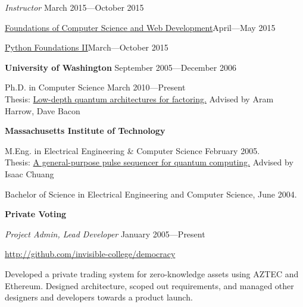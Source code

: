 \documentclass[letter]{article}
\begin{document}
\par
{\em Instructor} \hfill March 2015---October 2015

\vspace{0.5\baselineskip}
\par
\href{https://www.codefellows.org/courses/foundations-1/computer-science-and-web-development}{Foundations of Computer Science and Web Development}\hfill April---May 2015
\vspace{0.5\baselineskip}
\par
\href{https://www.codefellows.org/courses/foundations-2/python}{Python Foundations II}\hfill March---October 2015

\vspace{0.5\baselineskip}
{\bf University of Washington} \hspace*{\fill}September 2005---December 2006
\par
Ph.D. in Computer Science \hspace*{\fill}March 2010---Present\\
Thesis: \href{https://dl.acm.org/doi/book/10.5555/2604498}{Low-depth quantum architectures for factoring.} Advised by Aram Harrow, Dave Bacon\\
\vspace{0.5\baselineskip}

{\bf Massachusetts Institute of Technology}
\par
M.Eng. in Electrical Engineering \& Computer Science \hspace*{\fill}February 2005.\\
Thesis: \href{https://citeseerx.ist.psu.edu/viewdoc/summary?doi=10.1.1.120.6651&rank=1}{A general-purpose pulse sequencer for quantum computing.}{} Advised by Isaac Chuang\\
\par
Bachelor of Science in Electrical Engineering and Computer Science, June 2004.
\vspace{\baselineskip}
\par
\vspace{\baselineskip}
\par
{\bf {Private Voting}} 
\par
{\em Project Admin, Lead Developer} \hfill January 2005---Present
\par
\url{http://github.com/invisible-college/democracy}
\par
Developed a private trading system for zero-knowledge assets
using AZTEC and Ethereum. Designed architecture, scoped out
requirements, and managed other designers and developers
towards a product launch.
\end{document}

